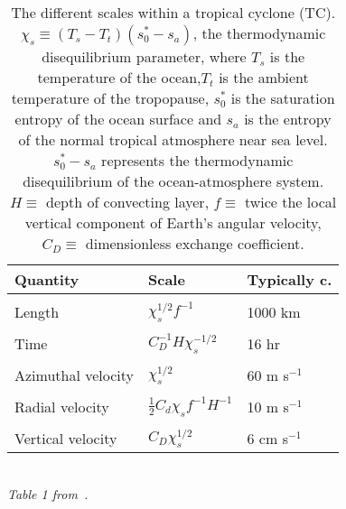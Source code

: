 
\begin{table}[h!]
\centering
\begin{tabular}{lll}
\hline \hline
\textbf{Quantity} & \textbf{Scale} & \textbf{Typically c.}\\
\hline \\
Length & $\chi_s^{1/2}f^{-1}$ & 1000 km \\ \\
Time & $C_D^{-1}H\chi_{s}^{-1/2}$ & 16 hr \\ \\
Azimuthal velocity & $\chi_s^{1/2}$ & 60 m s$^{-1}$\\ \\
Radial velocity & $\frac{1}{2}C_d\chi_s f^{-1}H^{-1}$ & 10 m s$^{-1}$\\ \\
Vertical velocity & $C_D \chi_s^{1/2}$ & 6 cm s$^{-1}$\\
\hline \hline
\end{tabular}\\
\textit{Table 1 from~\cite{emanuel1991theory}.}
\caption{The different scales within a tropical cyclone (TC).
$\chi_s\equiv(T_s-T_t)(s_{0}^{*}-s_a)$, the thermodynamic disequilibrium parameter,
 where $T_s$ is the temperature
of the ocean,$T_t$ is the ambient temperature of the tropopause,
$s_{0}^{*}$ is the saturation entropy of the ocean surface and
$s_a$ is the entropy of the normal tropical atmosphere near sea level.
$s_{0}^{*}-s_a$ represents the thermodynamic disequilibrium of the ocean-atmosphere
system. $H\equiv$ depth of convecting layer, $f\equiv$ twice the
local vertical component of Earth's angular velocity, $C_D\equiv$
dimensionless exchange coefficient.}

\label{tab:hurr-scales}
\end{table}

